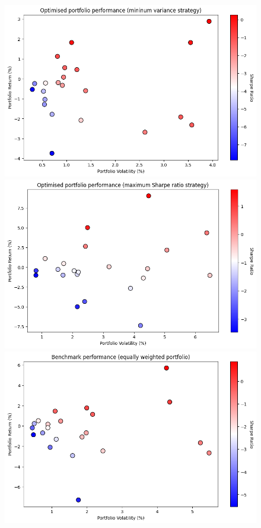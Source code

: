 \documentclass[a4paper,12pt]{article}
\begin{document}
\begin{figure}[H]
    \centering
    \begin{minipage}{0.7\textwidth}
    \centering
    \includegraphics[width=1\textwidth]{resources/Optimised portfolio performance (minimum variance portfolio).png}
    \end{minipage}
    \hfill
    \begin{minipage}{0.7\textwidth}
    \centering
    \includegraphics[width=1\textwidth]{resources/Optimised portfolio performance (maximum sharpe ratio strategy).png}
    \end{minipage}
    \begin{minipage}{0.7\textwidth}
    \centering
    \includegraphics[width=1\textwidth]{resources/Benchmark performance (equally weighted portfolio).png}

\end{minipage}
\end{figure}
\end{document}
